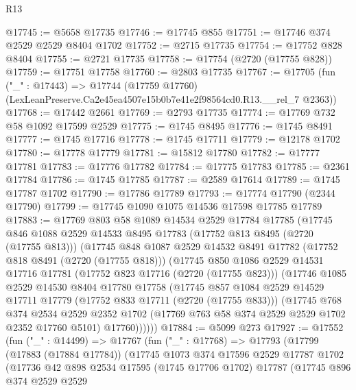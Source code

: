 \begin{lexlean}{R13}
\begin{coremodule}
@17745 := @5658 @17735
@17746 := @17745 @855
@17751 := @17746 @374 @2529 @2529 @8404 @1702
@17752 := @2715 @17735
@17754 := @17752 @828 @8404
@17755 := @2721 @17735
@17758 := @17754 (@2720 (@17755 @828))
@17759 := @17751 @17758
@17760 := @2803 @17735
@17767 := @17705
    (fun ("_" : @17443) =>
    @17744 (@17759 @17760) (LexLeanPreserve.Ca2e45ea4507e15b0b7e41e2f98564cd0.R13.__rel_7 @2363))
@17768 := @17442 @2661
@17769 := @2793 @17735
@17774 := @17769 @732 @58 @1092 @17599 @2529
@17775 := @1745 @8495
@17776 := @1745 @8491
@17777 := @1745 @17716
@17778 := @1745 @17711
@17779 := @12178 @1702
@17780 := @17778 @17779
@17781 := @15812 @17780
@17782 := @17777 @17781
@17783 := @17776 @17782
@17784 := @17775 @17783
@17785 := @2361 @17784
@17786 := @1745 @17785
@17787 := @2589 @17614
@17789 := @1745 @17787 @1702
@17790 := @17786 @17789
@17793 := @17774 @17790 (@2344 @17790)
@17799 := @17745 @1090 @1075 @14536 @17598 @17785 @17789
@17883 := @17769
    @803
    @58
    @1089
    @14534
    @2529
    @17784
    @17785
    (@17745
      @846
      @1088
      @2529
      @14533
      @8495
      @17783
      (@17752 @813 @8495 (@2720 (@17755 @813)))
      (@17745
        @848
        @1087
        @2529
        @14532
        @8491
        @17782
        (@17752 @818 @8491 (@2720 (@17755 @818)))
        (@17745
          @850
          @1086
          @2529
          @14531
          @17716
          @17781
          (@17752 @823 @17716 (@2720 (@17755 @823)))
          (@17746
            @1085
            @2529
            @14530
            @8404
            @17780
            @17758
            (@17745
              @857
              @1084
              @2529
              @14529
              @17711
              @17779
              (@17752 @833 @17711 (@2720 (@17755 @833)))
              (@17745
                @768
                @374
                @2534
                @2529
                @2352
                @1702
                (@17769 @763 @58 @374 @2529 @2529 @1702 @2352 @17760 @5101)
                @17760))))))
@17884 := @5099 @273
@17927 := @17552
    (fun ("_" : @14499) =>
    @17767
      (fun ("_" : @17768) =>
      @17793
        (@17799
          (@17883 (@17884 @17784))
          (@17745
            @1073
            @374
            @17596
            @2529
            @17787
            @1702
            (@17736
              @42
              @898
              @2534
              @17595
              (@1745 @17706 @1702)
              @17787
              (@17745
                @896
                @374
                @2529
                @2529

\end{coremodule}
\end{lexlean}
